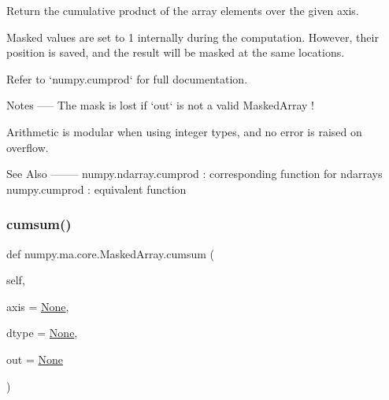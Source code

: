 \begin{DoxyVerb}Return the cumulative product of the array elements over the given axis.

Masked values are set to 1 internally during the computation.
However, their position is saved, and the result will be masked at
the same locations.

Refer to `numpy.cumprod` for full documentation.

Notes
-----
The mask is lost if `out` is not a valid MaskedArray !

Arithmetic is modular when using integer types, and no error is
raised on overflow.

See Also
--------
numpy.ndarray.cumprod : corresponding function for ndarrays
numpy.cumprod : equivalent function
\end{DoxyVerb}
 \mbox{\label{classnumpy_1_1ma_1_1core_1_1MaskedArray_a4db33f1e59fc42d11eb845a65ed2160d}} 
\subsubsection{\texorpdfstring{cumsum()}{cumsum()}}
{\footnotesize\ttfamily def numpy.\+ma.\+core.\+Masked\+Array.\+cumsum (\begin{DoxyParamCaption}\item[{}]{self,  }\item[{}]{axis = {\ttfamily \hyperlink{namespacenumpy_1_1ma_1_1core_a647ee1848dfa3692fe35a663a2aa40b3}{None}},  }\item[{}]{dtype = {\ttfamily \hyperlink{namespacenumpy_1_1ma_1_1core_a647ee1848dfa3692fe35a663a2aa40b3}{None}},  }\item[{}]{out = {\ttfamily \hyperlink{namespacenumpy_1_1ma_1_1core_a647ee1848dfa3692fe35a663a2aa40b3}{None}} }\end{DoxyParamCaption})}


